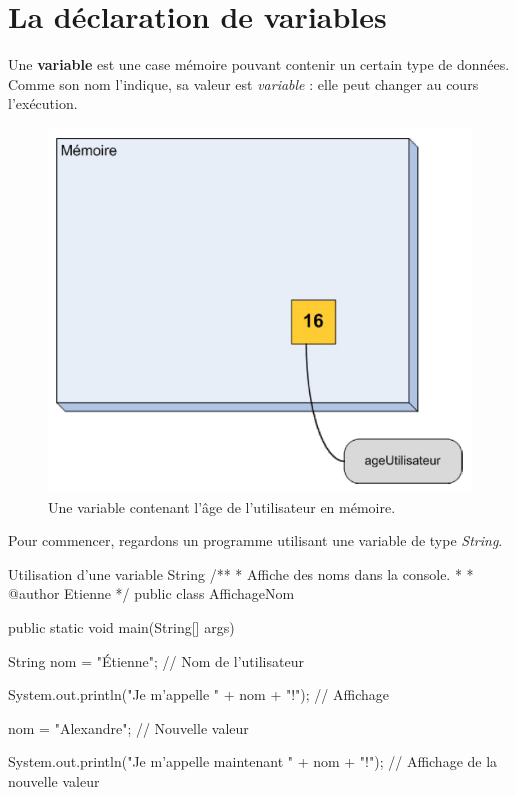 \documentclass[12pt]{report}
\begin{document}
\section{La déclaration de variables}
%
Une \textbf{variable} est une case mémoire pouvant contenir un certain type de données. Comme son nom l'indique, sa valeur est \emph{variable} : elle peut changer au cours l'exécution.

\begin{figure}[!ht]
	\centering
	\includegraphics[scale=0.75]{variable-memoire.png}
	\caption{Une variable contenant l'âge de l'utilisateur en mémoire.}
\end{figure}

Pour commencer, regardons un programme utilisant une variable de type \emph{String}.

\begin{MyTCB}{Utilisation d'une variable String}
/**
 * Affiche des noms dans la console.
 * 
 * @author Etienne
 */
public class AffichageNom {

	public static void main(String[] args) {
		
		String nom = "Étienne"; // Nom de l'utilisateur
		
		System.out.println("Je m'appelle " + nom + "!"); // Affichage
		
		nom = "Alexandre"; // Nouvelle valeur
		
		System.out.println("Je m'appelle maintenant " + nom + "!"); // Affichage de la nouvelle valeur
		
	}

}
\end{MyTCB}
\end{document}
